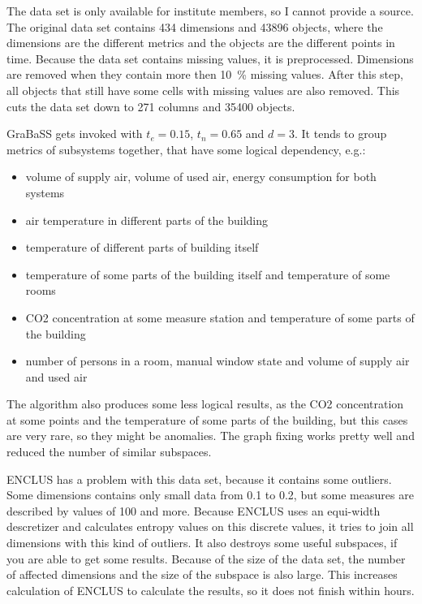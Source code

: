 The data set is only available for institute members, so I cannot provide a source. The original data set contains \num{434} dimensions and \num{43896} objects, where the dimensions are the different metrics and the objects are the different points in time. Because the data set contains missing values, it is preprocessed. Dimensions are removed when they contain more then \SI{10}{\percent} missing values. After this step, all objects that still have some cells with missing values are also removed. This cuts the data set down to \num{271} columns and \num{35400} objects.

GraBaSS gets invoked with $t_e = 0.15$, $t_n = 0.65$ and $d = 3$. It tends to group metrics of subsystems together, that have some logical dependency, e.g.:
\begin{itemize}
	\item volume of supply air, volume of used air, energy consumption for both systems
	\item air temperature in different parts of the building
	\item temperature of different parts of building itself
	\item temperature of some parts of the building itself and temperature of some rooms
	\item CO2 concentration at some measure station and temperature of some parts of the building
	\item number of persons in a room, manual window state and volume of supply air and used air
\end{itemize}

The algorithm also produces some less logical results, as the CO2 concentration at some points and the temperature of some parts of the building, but this cases are very rare, so they might be anomalies. The graph fixing works pretty well and reduced the number of similar subspaces.

ENCLUS has a problem with this data set, because it contains some outliers. Some dimensions contains only small data from \num{0.1} to \num{0.2}, but some measures are described by values of \num{100} and more. Because ENCLUS uses an equi-width descretizer and calculates entropy values on this discrete values, it tries to join all dimensions with this kind of outliers. It also destroys some useful subspaces, if you are able to get some results. Because of the size of the data set, the number of affected dimensions and the size of the subspace is also large. This increases calculation of ENCLUS to calculate the results, so it does not finish within hours.

